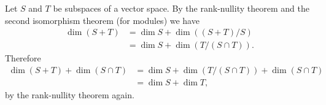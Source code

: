 \documentclass{article}
\def\dim{\operatorname{dim}}
\begin{document}
Let $S$ and $T$ be subspaces of a vector space.
By the rank-nullity theorem and the second isomorphism theorem (for modules)
we have
\begin{align*}
\dim(S+T) &= \dim S + \dim((S+T)/S) \\
          &= \dim S + \dim(T/(S\cap T)).
\end{align*}
Therefore
\begin{align*}
\dim(S+T) + \dim(S\cap T) &= \dim S + \dim(T/(S\cap T)) + \dim(S\cap T) \\
                          &= \dim S + \dim T,
\end{align*}
by the rank-nullity theorem again.
\end{document}
